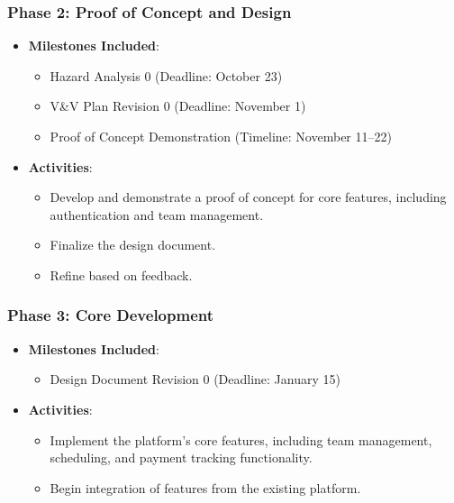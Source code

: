 \documentclass[12pt]{article}
\begin{document}
\subsubsection*{Phase 2: Proof of Concept and Design}
\begin{itemize}
    \item \textbf{Milestones Included}:
    \begin{itemize}
        \item Hazard Analysis 0 (Deadline: October 23)
        \item V\&V Plan Revision 0 (Deadline: November 1)
        \item Proof of Concept Demonstration (Timeline: November 11–22)
    \end{itemize}
    \item \textbf{Activities}:
    \begin{itemize}
        \item Develop and demonstrate a proof of concept for core features, including authentication and team management.
        \item Finalize the design document.
        \item Refine based on feedback.
    \end{itemize}
\end{itemize}

\subsubsection*{Phase 3: Core Development}
\begin{itemize}
    \item \textbf{Milestones Included}:
    \begin{itemize}
        \item Design Document Revision 0 (Deadline: January 15)
    \end{itemize}
    \item \textbf{Activities}:
    \begin{itemize}
        \item Implement the platform's core features, including team management, scheduling, and payment tracking functionality.
        \item Begin integration of features from the existing platform.
    \end{itemize}
\end{itemize}
\end{document}

